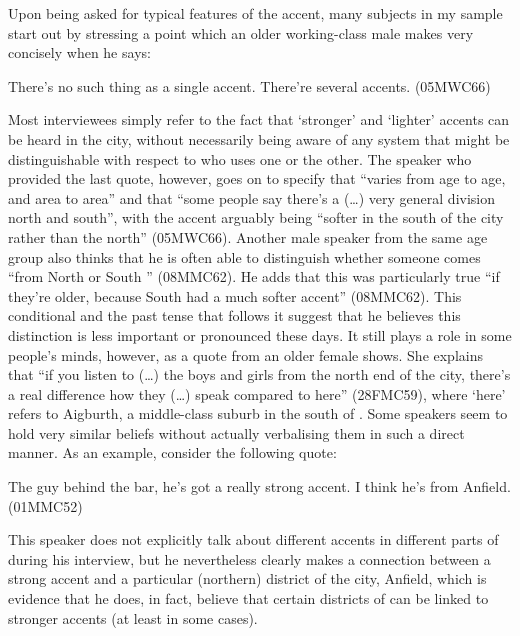 Upon being asked for typical features of the  accent, many subjects in my sample start out by stressing a point which an older working-class male makes very concisely when he says:
\begin{example}
	There's no such thing as a single  accent. There're several  accents. (05MWC66)
\end{example}
Most interviewees simply refer to the fact that `stronger' and `lighter' accents can be heard in the city, without necessarily being aware of any system that might be distinguishable with respect to who uses one or the other.
The speaker who provided the last quote, however, goes on to specify that  ``varies from age to age, and area to area'' and that ``some people say there's a (\ldots) very general division north and south'', with the accent arguably being ``softer in the south of the city rather than the north'' (05MWC66).
Another male speaker from the same age group also thinks that he is often able to distinguish whether someone comes ``from North  or South '' (08MMC62).
He adds that this was particularly true ``if they're older, because South  had a much softer accent'' (08MMC62).
This conditional and the past tense that follows it suggest that he believes this distinction is less important or pronounced these days.
It still plays a role in some people's minds, however, as a quote from an older female shows.
She explains that ``if you listen to (\ldots) the boys and girls from the north end of the city, there's a real difference how they (\ldots) speak compared to here'' (28FMC59), where `here' refers to Aigburth, a middle-class suburb in the south of .
Some speakers seem to hold very similar beliefs without actually verbalising them in such a direct manner.
As an example, consider the following quote:
\begin{example}
	The guy behind the bar, he's got a really strong accent. I think he's from Anfield. (01MMC52)
\end{example}
This speaker does not explicitly talk about different accents in different parts of  during his interview, but he nevertheless clearly makes a connection between a strong accent and a particular (northern) district of the city, Anfield, which is evidence that he does, in fact, believe that certain districts of  can be linked to stronger accents (at least in some cases).

